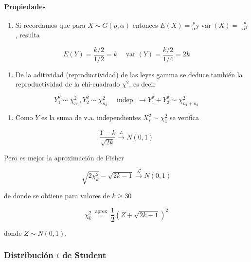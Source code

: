 \documentclass[
]{article}
\providecommand{\tightlist}{%
  \setlength{\itemsep}{0pt}\setlength{\parskip}{0pt}}
\begin{document}
\paragraph{Propiedades}\label{propiedades}

\begin{enumerate}
\def\labelenumi{\arabic{enumi}.}
\tightlist
\item
  Si recordamos que para \(X \sim G(p, \alpha)\) entonces \(E(X)=\frac{p}{\alpha} \mathrm{y} \operatorname{var}(X)=\) \(\frac{p}{\alpha^{2}}\), resulta
\end{enumerate}

\[
E(Y)=\frac{k / 2}{1 / 2}=k \quad \operatorname{var}(Y)=\frac{k / 2}{1 / 4}=2 k
\]

\begin{enumerate}
\def\labelenumi{\arabic{enumi}.}
\setcounter{enumi}{1}
\tightlist
\item
  De la aditividad (reproductividad) de las leyes gamma se deduce también la reproductividad de la chi-cuadrado \(\chi^{2}\), es decir
\end{enumerate}

\[
Y_{1}^{2} \sim \chi_{n_{1}}^{2}, Y_{2}^{2} \sim \chi_{n_{2}}^{2} \quad \text { indep. } \longrightarrow Y_{1}^{2}+Y_{2}^{2} \sim \chi_{n_{1}+n_{2}}^{2}
\]

\begin{enumerate}
\def\labelenumi{\arabic{enumi}.}
\setcounter{enumi}{2}
\tightlist
\item
  Como \(Y\) es la suma de v.a. independientes \(X_{i}^{2} \sim \chi_{1}^{2}\) se verifica
\end{enumerate}

\[
\frac{Y-k}{\sqrt{2 k}} \xrightarrow{\mathcal{L}} N(0,1)
\]

Pero es mejor la aproximación de Fisher

\[
\sqrt{2 \chi_{k}^{2}}-\sqrt{2 k-1} \xrightarrow{\mathcal{L}} N(0,1)
\]

de donde se obtiene para valores de \(k \geq 30\)

\[
\chi_{k}^{2} \stackrel{\text { aprox }}{=} \frac{1}{2}(Z+\sqrt{2 k-1})^{2}
\]

donde \(Z \sim N(0,1)\).

\subsubsection{\texorpdfstring{Distribución \(t\) de Student}{Distribución t de Student}}\label{distribuciuxf3n-t-de-student}
\end{document}
